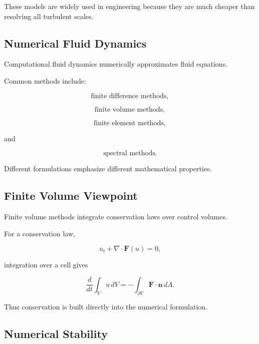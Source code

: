 These models are widely used in engineering because they are much cheaper
than resolving all turbulent scales.

\subsection{Numerical Fluid Dynamics}
\label{subsec:numerical-fluid-dynamics}

Computational fluid dynamics numerically approximates fluid equations.

Common methods include:

\[
\boxed{
\text{finite difference methods},
}
\]

\[
\boxed{
\text{finite volume methods},
}
\]

\[
\boxed{
\text{finite element methods},
}
\]

and

\[
\boxed{
\text{spectral methods}.
}
\]

Different formulations emphasize different mathematical properties.

\subsection{Finite Volume Viewpoint}
\label{subsec:finite-volume-viewpoint}

Finite volume methods integrate conservation laws over control volumes.

For a conservation law,

\[
\boxed{
u_t+\nabla\cdot\mathbf{F}(u)=0,
}
\]

integration over a cell gives

\[
\boxed{
\frac{d}{dt}
\int_Vu\,dV
=
-
\int_{\partial V}
\mathbf{F}\cdot\mathbf{n}\,dA.
}
\]

Thus conservation is built directly into the numerical formulation.

\subsection{Numerical Stability}
\label{subsec:fluid-numerical-stability}

